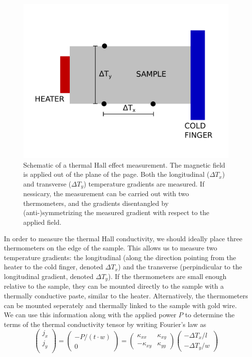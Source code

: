 \documentclass{thesis-umich}
\begin{document}
\begin{figure}
	\caption[Schematic of a thermal Hall effect measurement]{Schematic of a thermal Hall effect measurement. The magnetic field is applied out of the plane of the page. Both the longitudinal ($\Delta T_x$) and transverse ($\Delta T_y$) temperature gradients are measured. If nessicary, the measurement can be carried out with two thermometers, and the gradients disentangled by (anti-)symmetrizing the measured gradient with respect to the applied field.}
	\label{fig:thall_geometry}
	\includegraphics[width=\columnwidth]{figures/thall_geometry.pdf}
\end{figure}
In order to measure the thermal Hall conductivity, we should ideally place three thermometers on the edge of the sample. This allows us to measure two temperature gradients: the longitudinal (along the direction pointing from the heater to the cold finger, denoted $\Delta T_x$) and the transverse (perpindicular to the longitudinal gradient, denoted $\Delta T_y$). If the thermometers are small enough relative to the sample, they can be mounted directly to the sample with a thermally conductive paste, similar to the heater. Alternatively, the thermometers can be mounted seperately and thermally linked to the sample with gold wire. We can use this information along with the applied power $P$ to determine the terms of the thermal conductivity tensor by writing Fourier's law as
\[ \begin{pmatrix}
		j_x \\
		j_y \\
\end{pmatrix}
= \begin{pmatrix}
	-P/(t\cdot w) \\
	0
\end{pmatrix}
= \begin{pmatrix}
	\kappa_{xx} & \kappa_{xy} \\
	-\kappa_{xy} & \kappa_{yy} 
\end{pmatrix}
\begin{pmatrix}
	-\Delta T_x/l \\
	-\Delta T_y/w
\end{pmatrix} \]
\end{document}
